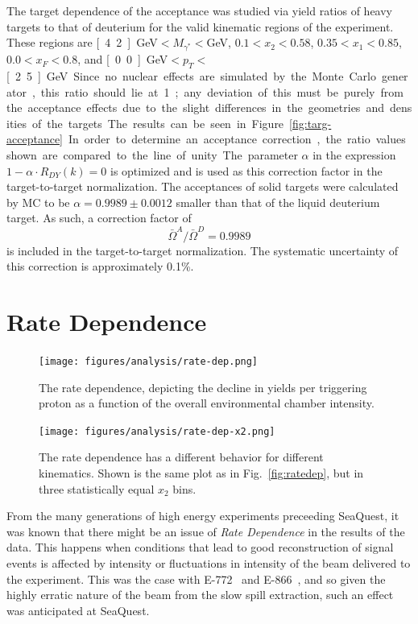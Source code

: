 The target dependence of the acceptance was studied via yield ratios of heavy targets to that of deuterium for the valid kinematic regions of the experiment. These regions are \unit[4.2]{GeV}$<M_{\gamma^*}<$\unit[10]{GeV}, $0.1<x_2<0.58$, $0.35<x_1<0.85$, $0.0<x_F<0.8$, and \unit[0.0]{GeV}$<p_T<$\unit[2.5]{GeV}. Since no nuclear effects are simulated by the Monte Carlo generator, this ratio should lie at 1; any deviation of this must be purely from the acceptance effects due to the slight differences in the geometries and densities of the targets. The results can be seen in Figure~\ref{fig:targ-acceptance}.

In order to determine an acceptance correction, the ratio values shown are compared to the line of unity. The parameter $\alpha$ in the expression $1 - \alpha \cdot R_{DY}(k) = 0$ is optimized and is used as this correction factor in the target-to-target normalization. The acceptances of solid targets were calculated by MC to be $\alpha = 0.9989 \pm 0.0012$ smaller than that of the liquid deuterium target. As such, a correction factor of $$\bar{\Omega}^A/\bar{\Omega}^D = 0.9989$$ is included in the target-to-target normalization. The systematic uncertainty of this correction is approximately 0.1\%.

\section{Rate Dependence}

\begin{figure}
	\centering
	\begin{minipage}{0.48\textwidth}
		\centering
		\texttt{[image: figures/analysis/rate-dep.png]}
		\caption{The rate dependence, depicting the decline in yields per triggering proton as a function of the overall environmental chamber intensity.}
		\label{fig:ratedep}
	\end{minipage}\hfill
	\begin{minipage}{0.48\textwidth}
		\centering
		\texttt{[image: figures/analysis/rate-dep-x2.png]}
		\caption{The rate dependence has a different behavior for different kinematics. Shown is the same plot as in Fig.~\ref{fig:ratedep}, but in three statistically equal $x_2$ bins.}
		\label{fig:x2-ratedep}
	\end{minipage}
\end{figure}

From the many generations of high energy experiments preceeding SeaQuest, it was known that there might be an issue of \emph{Rate Dependence} in the results of the data. This happens when conditions that lead to good reconstruction of signal events is affected by intensity or fluctuations in intensity of the beam delivered to the experiment. This was the case with E-772~\cite{Wang:1991wa} and E-866~\cite{Towell:2001nh}, and so given the highly erratic nature of the beam from the slow spill extraction, such an effect was anticipated at SeaQuest.

